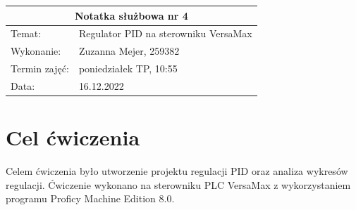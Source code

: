 \documentclass[12pt]{article}
\begin{document}
\renewcommand{\figurename}{Rys.}
\newcommand{\zdjecie}[3]
{
    \begin{figure}[H]
        \renewcommand{\figurename}{Rys.}
        \centering
        \texttt{[image: \#1]}
        \caption{#2}
        \label{#3}
    \end{figure}
}

\begin{table}[H]
    \centering
    \renewcommand{\arraystretch}{1.5}
    \begin{tabularx}{\textwidth}{|X|X|}
    \hline
    \multicolumn{2}{|c|}{\large\textbf{Notatka służbowa nr 4}} \\ \hline
    Temat:          & Regulator PID na sterowniku VersaMax    \\ \hline
    Wykonanie:      & Zuzanna Mejer, 259382   \\ \hline
    Termin zajęć:   & poniedziałek TP, 10:55  \\ \hline  
    Data:           & 16.12.2022    \\ \hline
    \end{tabularx}
    \end{table}

\section{Cel ćwiczenia}
Celem ćwiczenia było utworzenie projektu regulacji PID oraz analiza wykresów regulacji. Ćwiczenie wykonano na sterowniku PLC VersaMax z wykorzystaniem programu Proficy Machine Edition 8.0. 
\end{document}
